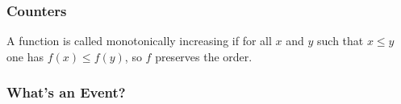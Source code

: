 \begin{frame}
    \frametitle{Counters}

    \begin{definition}
        A function is called monotonically increasing if for all $x$ and
        $y$ such that $x \leq y$ one has
        $f(x) \leq f(y)$, so $f$
        preserves the order.
    \end{definition}

    \begin{center}
    \end{center}
\end{frame}

\begin{frame}
    \frametitle{What's an Event?}

\end{frame}


